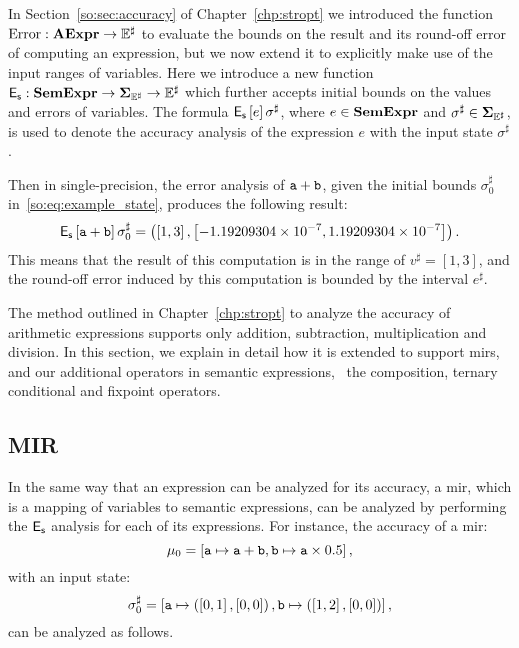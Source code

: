In Section~\ref{so:sec:accuracy} of Chapter~\ref{chp:stropt} we introduced the
function $\operatorname{\mathrm{Error}}: \mathbf{AExpr} \to \mathbb{E}^\sharp$ to evaluate the bounds on the result
and its round-off error of computing an expression, but we now extend it to
explicitly make use of the input ranges of variables.  Here we introduce a new
function $\operatorname{\mathsf{E}_\mathsf{s}}: \mathbf{SemExpr} \to \mathbf{\Sigma}_{\mathbb{E}^\sharp} \to \mathbb{E}^\sharp$ which further
accepts initial bounds on the values and errors of variables.  The formula
$\operatorname{\mathsf{E}_\mathsf{s}}\left[{e}\right]{\sigma^\sharp}$, where $e \in \mathbf{SemExpr}$ and $\sigma^\sharp
\in \mathbf{\Sigma}_{\mathbb{E}^\sharp}$, is used to denote the accuracy analysis of the expression $e$
with the input state $\sigma^\sharp$.

Then in single-precision, the error analysis of $\texttt{a} + \texttt{b}$, given the
initial bounds $\sigma^\sharp_0$ in~\eqref{so:eq:example_state}, produces the
following result:
\begin{equation}
    \operatorname{\mathsf{E}_\mathsf{s}}\left[{\texttt{a} + \texttt{b}}\right]{\sigma^\sharp_0} = \left(
        \left[{1}, {3}\right],
        \left[{-1.19209304 \times 10^{-7}}, {1.19209304 \times 10^{-7}}\right]
    \right).
\end{equation}
This means that the result of this computation is in the range of $v^\sharp =
[1, 3]$, and the round-off error induced by this computation is bounded by the
interval $e^\sharp$.

The method outlined in Chapter~\ref{chp:stropt} to analyze the accuracy of
arithmetic expressions supports only addition, subtraction, multiplication and
division.  In this section, we explain in detail how it is extended to support
\glspl{mir}, and our additional operators in semantic expressions, \ie~the
composition, ternary conditional and fixpoint operators.

\subsection{MIR}

In the same way that an expression can be analyzed for its accuracy, a
\gls{mir}, which is a mapping of variables to semantic expressions, can
be analyzed by performing the $\operatorname{\mathsf{E}_\mathsf{s}}$ analysis for each of its
expressions.  For instance, the accuracy of a \gls{mir}\@:
\begin{equation}
    \mu_0 = \left[
        \texttt{a} \mapsto \texttt{a} + \texttt{b},
        \texttt{b} \mapsto \texttt{a} \times 0.5
    \right],
\end{equation}
with an input state:
\begin{equation}
    \sigma^\sharp_0 = \left[
        \texttt{a} \mapsto \left(
            \left[{0}, {1}\right], \left[{0}, {0}\right]
        \right),
        \texttt{b} \mapsto \left(
            \left[{1}, {2}\right], \left[{0}, {0}\right]
        \right)
    \right],
\end{equation}
can be analyzed as follows.

